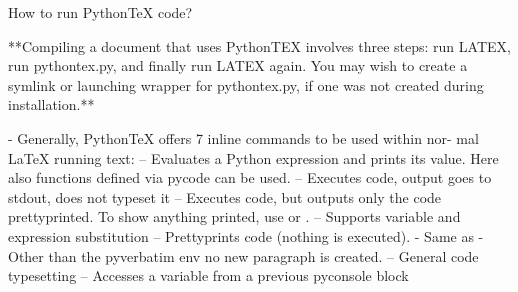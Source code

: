 How to run PythonTeX code?

**Compiling a document that uses PythonTEX involves three steps: run LATEX, run pythontex.py, and finally run LATEX again.
You may wish to create a symlink or launching wrapper for pythontex.py, if one was not created during installation.**

 - Generally, PythonTeX offers 7 inline commands to be used within nor-
mal LaTeX running text:
– \py Evaluates a Python expression and prints its value. Here
also functions defined via pycode can be used.
– \pyc Executes code, output goes to stdout, does not typeset it
– \pyb Executes code, but outputs only the code prettyprinted.
To show anything printed, use \printpythontex or \stdoutpythontex.
– \pys Supports variable and expression substitution
– \pyv Prettyprints code (nothing is executed).
- Same as 
- Other than the pyverbatim env no new paragraph is created.
– \pygment General code typesetting
– \pycon Accesses a variable from a previous pyconsole block
